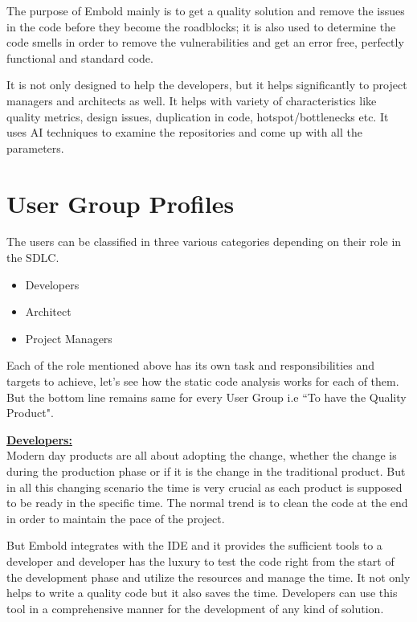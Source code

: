 The purpose of Embold mainly is to get a quality solution and remove the issues in the code before they become the roadblocks; it is also used to determine the code smells in order to remove the vulnerabilities and get an error free, perfectly functional and standard code. \par
It is not only designed to help the developers, but it helps significantly to project managers and architects as well. It helps with variety of characteristics like quality metrics, design issues, duplication in code, hotspot/bottlenecks etc. It uses AI techniques to examine the repositories and come up with all the parameters.
 
	
\section{User Group Profiles}
The users can be classified in three various categories depending on their role in the SDLC.
\begin{itemize}
\item Developers
\item Architect
\item Project Managers
\end{itemize}

Each of the role mentioned above has its own task and responsibilities and targets to achieve, let's see how the static code analysis works for each of them. But the bottom line remains same for every User Group i.e ``To have the Quality Product".~\cite{UX}
\vspace{2mm}

\textbf{\underline{Developers:}} \vspace{2mm}\\
\indent Modern day products are all about adopting the change, whether the change is during the production phase or if it is the change in the traditional product.  But in all this changing scenario the time is very crucial as each product is supposed to be ready in the specific time. The normal trend is to clean the code at the end in order to maintain the pace of the project.  \par \vspace{1mm}
But Embold integrates with the IDE and it provides the sufficient tools to a developer and developer has the luxury to test the code right from the start of the development phase and utilize the resources and manage the time. It not only helps to write a quality code but it also saves the time. Developers can use this tool in a comprehensive manner for the development of any kind of solution.

